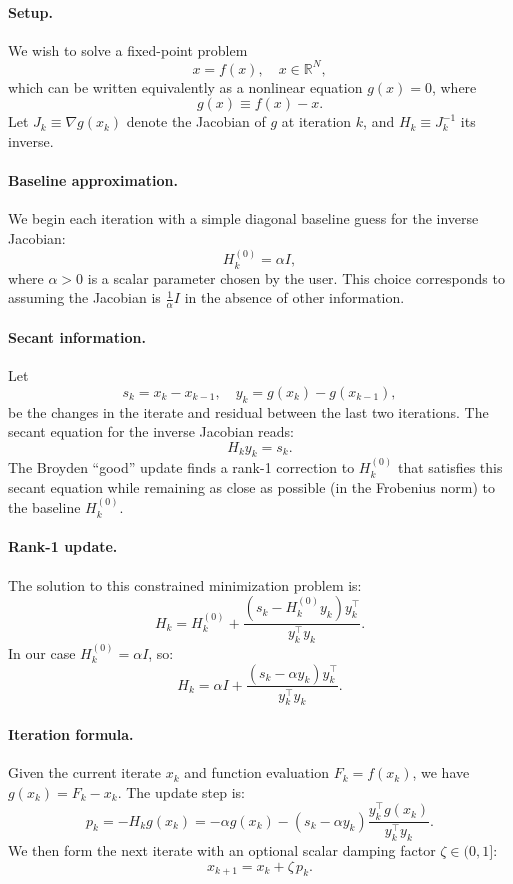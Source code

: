 \documentclass[a4paper,12pt]{article}
\begin{document}
\paragraph{Setup.}
We wish to solve a fixed-point problem
\[
x = f(x), \quad x \in \mathbb{R}^N,
\]
which can be written equivalently as a nonlinear equation $g(x) = 0$, where
\[
g(x) \equiv f(x) - x.
\]
Let $J_k \equiv \nabla g(x_k)$ denote the Jacobian of $g$ at iteration $k$, and $H_k \equiv J_k^{-1}$ its inverse.

\paragraph{Baseline approximation.}
We begin each iteration with a simple diagonal baseline guess for the inverse Jacobian:
\[
H_k^{(0)} = \alpha I,
\]
where $\alpha > 0$ is a scalar parameter chosen by the user. This choice corresponds to assuming the Jacobian is $\frac{1}{\alpha}I$ in the absence of other information.

\paragraph{Secant information.}
Let
\[
s_k = x_k - x_{k-1}, \quad y_k = g(x_k) - g(x_{k-1}),
\]
be the changes in the iterate and residual between the last two iterations. The secant equation for the inverse Jacobian reads:
\[
H_k y_k = s_k.
\]
The Broyden ``good'' update finds a rank-1 correction to $H_k^{(0)}$ that satisfies this secant equation while remaining as close as possible (in the Frobenius norm) to the baseline $H_k^{(0)}$.

\paragraph{Rank-1 update.}
The solution to this constrained minimization problem is:
\[
H_k = H_k^{(0)} + \frac{(s_k - H_k^{(0)} y_k) y_k^\top}{y_k^\top y_k}.
\]
In our case $H_k^{(0)} = \alpha I$, so:
\[
H_k = \alpha I + \frac{(s_k - \alpha y_k) y_k^\top}{y_k^\top y_k}.
\]

\paragraph{Iteration formula.}
Given the current iterate $x_k$ and function evaluation $F_k = f(x_k)$, we have $g(x_k) = F_k - x_k$. The update step is:
\[
p_k = - H_k g(x_k)
= -\alpha g(x_k) - (s_k - \alpha y_k) \frac{y_k^\top g(x_k)}{y_k^\top y_k}.
\]
We then form the next iterate with an optional scalar damping factor $\zeta \in (0,1]$:
\[
x_{k+1} = x_k + \zeta\, p_k.
\]
\end{document}
